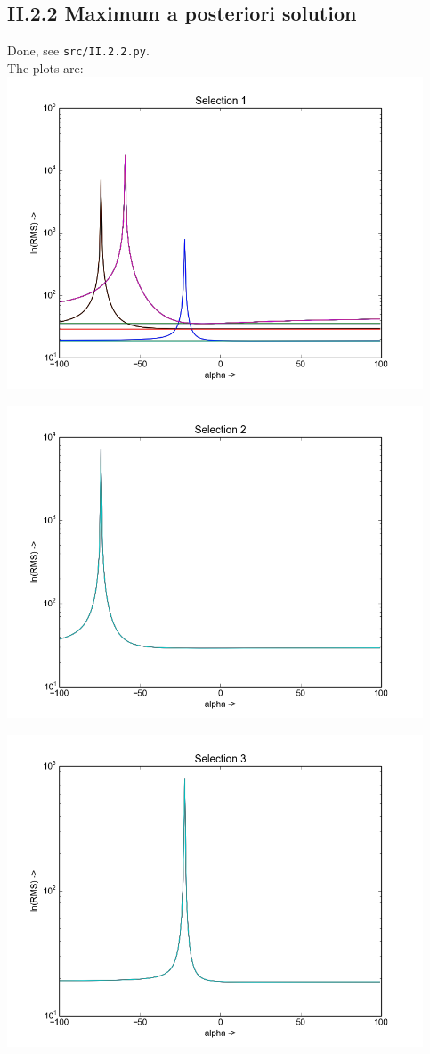 \documentclass{article}
\theoremstyle{dotless}
\begin{document}
\subsection{II.2.2 Maximum a posteriori solution}

Done, see \texttt{src/II.2.2.py}.\\

The plots are:\\

\includegraphics[keepaspectratio=true, width=350pt]{src/img/sel1.png}

\includegraphics[keepaspectratio=true, width=350pt]{src/img/sel2.png}

\includegraphics[keepaspectratio=true, width=350pt]{src/img/sel3.png}
\end{document}
